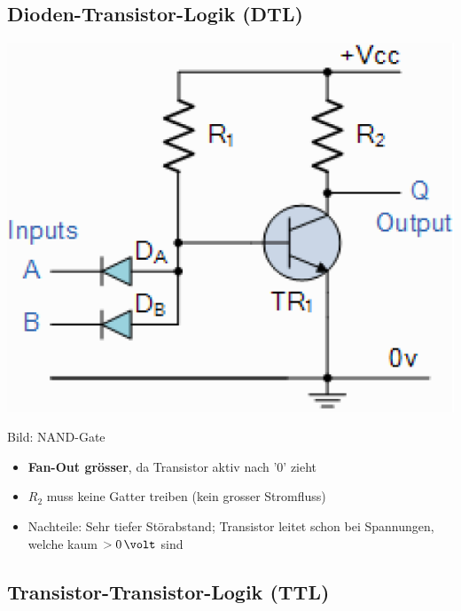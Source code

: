 \subsection{Dioden-Transistor-Logik (DTL)}

\begin{minipage}[c]{0.3\columnwidth}
    \includegraphics[width=\columnwidth]{images/dtl_nand_gate.png}
\end{minipage}
\hfill
\begin{minipage}[c]{0.68\columnwidth}
    Bild: NAND-Gate

    \begin{itemize}
        \item \textbf{Fan-Out grösser}, da Transistor aktiv nach '0' zieht
        \item $R_2$ muss keine Gatter treiben (kein grosser Stromfluss)
        \item Nachteile: Sehr tiefer Störabstand; Transistor leitet schon bei Spannungen, welche kaum $> 0 \, \volt$ sind 
    \end{itemize}
\end{minipage}


\subsection{Transistor-Transistor-Logik (TTL)}

